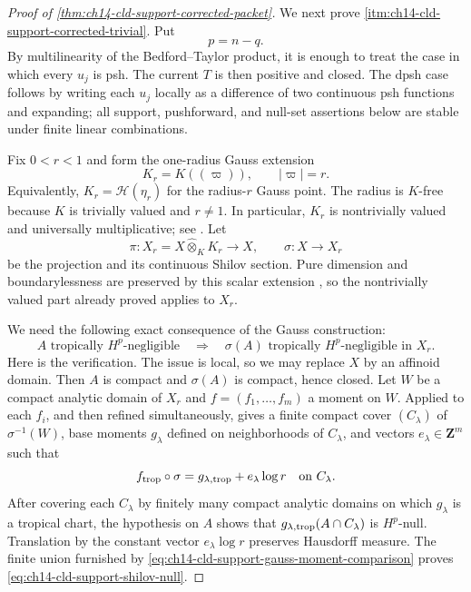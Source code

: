 \begin{proof}[Proof of
\cref{thm:ch14-cld-support-corrected-packet}]
We next prove
\cref{itm:ch14-cld-support-corrected-trivial}.  Put
\begin{equation}
\label{eq:ch14-cld-support-p-equals-n-minus-q}
                              p=n-q.
\end{equation}
By multilinearity of the Bedford--Taylor product, it is enough to treat the
case in which every $u_j$ is psh.  The current $T$ is then positive and
closed.  The dpsh case follows by writing each $u_j$ locally as a difference
of two continuous psh functions and expanding; all support, pushforward,
and null-set assertions below are stable under finite linear combinations.

Fix $0<r<1$ and form the one-radius Gauss extension
\[
              K_r=K((\varpi)),\qquad |\varpi|=r.
\]
Equivalently, $K_r=\mathscr H(\eta_r)$ for the radius-$r$ Gauss point.  The
radius is $K$-free because $K$ is trivially valued and $r\ne1$.  In
particular, $K_r$ is nontrivially valued and universally multiplicative;
see \cite[Example~11.1.3 and \S12.7.4]{CLD25}.  Let
\[
 \pi:X_r=X\widehat\otimes_KK_r\longrightarrow X,
 \qquad
 \sigma:X\longrightarrow X_r
\]
be the projection and its continuous Shilov section.  Pure dimension and
boundarylessness are preserved by this scalar extension
\cite[\S\S11.2.5 and 11.4.1]{CLD25}, so the nontrivially valued part already
proved applies to $X_r$.

We need the following exact consequence of the Gauss construction:
\begin{equation}
\label{eq:ch14-cld-support-shilov-null}
        A\text{ tropically }H^p\text{-negligible}
        \quad\Longrightarrow\quad
        \sigma(A)\text{ tropically }H^p\text{-negligible in }X_r.
\end{equation}
Here is the verification.  The issue is local, so we may replace $X$ by an
affinoid domain.  Then $A$ is compact and $\sigma(A)$ is compact, hence
closed.  Let $W$ be a compact analytic domain of $X_r$ and
$f=(f_1,\ldots,f_m)$ a moment on $W$.  Applied to each $f_i$, and then
refined simultaneously, \cite[Lemma~16.8.7]{CLD25} gives a finite compact
cover $(C_\lambda)$ of $\sigma^{-1}(W)$, base moments $g_\lambda$ defined on
neighborhoods of $C_\lambda$, and vectors $e_\lambda\in\mathbf Z^m$ such
that
\begin{equation}
\label{eq:ch14-cld-support-gauss-moment-comparison}
 f_{\mathrm{trop}}\circ\sigma
       =g_{\lambda,\mathrm{trop}}+e_\lambda\log r
                 \quad\text{on }C_\lambda.
\end{equation}
After covering each $C_\lambda$ by finitely many compact analytic domains
on which $g_\lambda$ is a tropical chart, the hypothesis on $A$ shows that
$g_{\lambda,\mathrm{trop}}(A\cap C_\lambda)$ is $H^p$-null.  Translation by the
constant vector $e_\lambda\log r$ preserves Hausdorff measure.  The finite
union furnished by
\eqref{eq:ch14-cld-support-gauss-moment-comparison} proves
\eqref{eq:ch14-cld-support-shilov-null}.


\end{proof}
